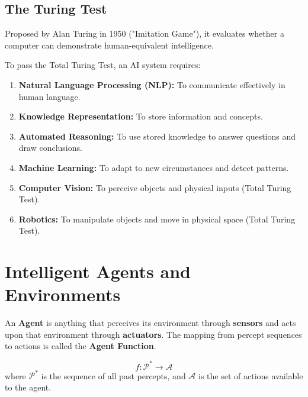 \documentclass[12pt,a4paper]{article}
\begin{document}
\subsection{The Turing Test}
Proposed by Alan Turing in 1950 ("Imitation Game"), it evaluates whether a computer can demonstrate human-equivalent intelligence.

\begin{tcolorbox}[examplebox, title={Capabilities Required for the Turing Test}]
  To pass the Total Turing Test, an AI system requires:
  \begin{enumerate}[leftmargin=*, noitemsep]
    \item \textbf{Natural Language Processing (NLP):} To communicate effectively in human language.
    \item \textbf{Knowledge Representation:} To store information and concepts.
    \item \textbf{Automated Reasoning:} To use stored knowledge to answer questions and draw conclusions.
    \item \textbf{Machine Learning:} To adapt to new circumstances and detect patterns.
    \item \textbf{Computer Vision:} To perceive objects and physical inputs (Total Turing Test).
    \item \textbf{Robotics:} To manipulate objects and move in physical space (Total Turing Test).
  \end{enumerate}
\end{tcolorbox}

\section{Intelligent Agents and Environments}

\begin{tcolorbox}[defbox, title={Definition of an Agent}]
  An \textbf{Agent} is anything that perceives its environment through \textbf{sensors} and acts upon that environment through \textbf{actuators}. The mapping from percept sequences to actions is called the \textbf{Agent Function}.
\end{tcolorbox}

\begin{tcolorbox}[formulabox, title={Mathematical Formulation of an Agent}]
  \begin{equation}
    f: \mathcal{P}^* \to \mathcal{A}
  \end{equation}
  where $\mathcal{P}^*$ is the sequence of all past percepts, and $\mathcal{A}$ is the set of actions available to the agent.
\end{tcolorbox}
\end{document}
